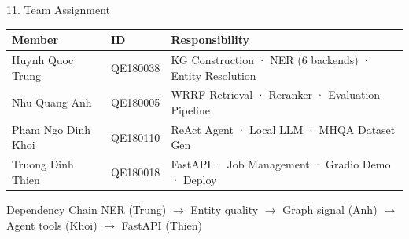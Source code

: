 \documentclass[aspectratio=169]{beamer}
\newcommand{\pos}[1]{\textcolor{positive}{#1}}
\newcommand{\con}[1]{\textcolor{negative}{#1}}
\begin{document}

\begin{frame}{11. Team Assignment}
\begin{center}
\small
\begin{tabular}{ll>{\raggedright\arraybackslash}p{6.2cm}}
\toprule
\textbf{Member} & \textbf{ID} & \textbf{Responsibility} \\
\midrule
Huynh Quoc Trung & QE180038 & KG Construction · NER (6 backends) · Entity Resolution \\
Nhu Quang Anh & QE180005 & WRRF Retrieval · Reranker · Evaluation Pipeline \\
Pham Ngo Dinh Khoi & QE180110 & ReAct Agent · Local LLM · MHQA Dataset Gen \\
Truong Dinh Thien & QE180018 & FastAPI · Job Management · Gradio Demo · Deploy \\
\bottomrule
\end{tabular}
\end{center}
\vspace{0.6em}
\begin{block}{Dependency Chain}
\centering
NER (Trung) $\rightarrow$ Entity quality $\rightarrow$ Graph signal (Anh) $\rightarrow$ Agent tools (Khoi) $\rightarrow$ FastAPI (Thien)
\end{block}
\end{frame}
\end{document}
